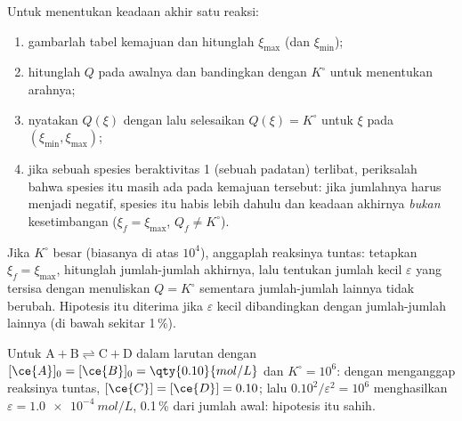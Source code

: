 \begin{method}\label{met:b1:extent-q-and-k:final-state}
Untuk menentukan keadaan akhir satu reaksi:
\begin{enumerate}
  \item gambarlah tabel kemajuan dan hitunglah $\xi_{\max}$ (dan
        $\xi_{\min}$);
  \item hitunglah $Q$ pada awalnya dan bandingkan dengan $K^\circ$ untuk
        menentukan arahnya;
  \item nyatakan $Q(\xi)$ dengan  lalu selesaikan
        $Q(\xi) = K^\circ$ untuk $\xi$ pada $(\xi_{\min}, \xi_{\max})$;
  \item jika sebuah spesies beraktivitas 1 (sebuah padatan) terlibat,
        periksalah bahwa spesies itu masih ada pada kemajuan tersebut:
        jika jumlahnya harus menjadi negatif, spesies itu habis lebih
        dahulu dan keadaan akhirnya \emph{bukan} kesetimbangan
        ($\xi_f = \xi_{\max}$, $Q_f \ne K^\circ$).
\end{enumerate}
\end{method}

\begin{method}\label{met:b1:extent-q-and-k:quantitative}
Jika $K^\circ$ besar (biasanya di atas $10^4$), anggaplah reaksinya
tuntas: tetapkan $\xi_f = \xi_{\max}$, hitunglah jumlah-jumlah akhirnya,
lalu tentukan jumlah kecil $\varepsilon$  yang tersisa
dengan menuliskan $Q =
K^\circ$ sementara jumlah-jumlah lainnya tidak
berubah. Hipotesis itu diterima jika $\varepsilon$ kecil dibandingkan
dengan jumlah-jumlah lainnya (di bawah sekitar 1\,\%).
\end{method}

\begin{example}\label{ex:b1:extent-q-and-k:quant}
Untuk $\mathrm{A + B \rightleftharpoons C + D}$ dalam larutan dengan $[\ce{A}]_0 = [\ce{B}]_0 =
\qty{0.10}{mol/L}$ dan $K^\circ = 10^6$: dengan menganggap reaksinya
tuntas, $[\ce{C}]
= [\ce{D}] = 0.10$; lalu $0.10^2/\varepsilon^2 = 10^6$ menghasilkan $\varepsilon
= \qty{1.0e-4}{mol/L}$, 0.1\,\% dari jumlah awal: hipotesis itu sahih.
\end{example}

